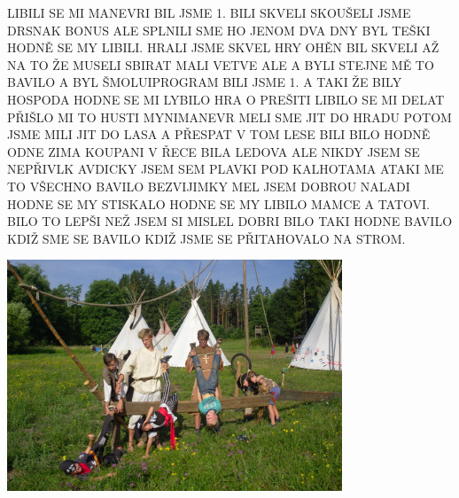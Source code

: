 \begin{multicols}{2}



LIBILI SE MI MANEVRI BIL JSME 1. BILI SKVELI SKOUŠELI JSME DRSNAK BONUS ALE SPLNILI SME HO JENOM DVA DNY BYL TEŠKI HODNĚ SE MY LIBILI. HRALI JSME SKVEL HRY OHĚN BIL SKVELI AŽ NA TO ŽE MUSELI SBIRAT MALI VETVE ALE A BYLI STEJNE MĚ TO BAVILO A BYL ŠMOLUIPROGRAM BILI JSME 1. A TAKI ŽE BILY HOSPODA HODNE SE MI LYBILO HRA O PREŠITI LIBILO SE MI DELAT PŘIŠLO MI TO HUSTI MYNIMANEVR MELI SME JIT DO HRADU POTOM JSME MILI JIT DO LASA A PŘESPAT V TOM LESE BILI BILO HODNĚ ODNE ZIMA KOUPANI V ŘECE BILA LEDOVA ALE NIKDY JSEM SE NEPŘIVLK AVDICKY JSEM SEM PLAVKI POD KALHOTAMA ATAKI ME TO VŠECHNO BAVILO BEZVIJIMKY MEL JSEM DOBROU NALADI HODNE SE MY STISKALO HODNE SE MY LIBILO MAMCE A TATOVI. BILO TO LEPŠI NEŽ JSEM SI MISLEL DOBRI BILO TAKI HODNE BAVILO KDIŽ SME SE BAVILO KDIŽ JSME SE PŘITAHOVALO NA STROM.



	
\end{multicols}
\begin{center}

\includegraphics[width=10cm]{img/druziny/kocicaci.jpg}

\end{center}

